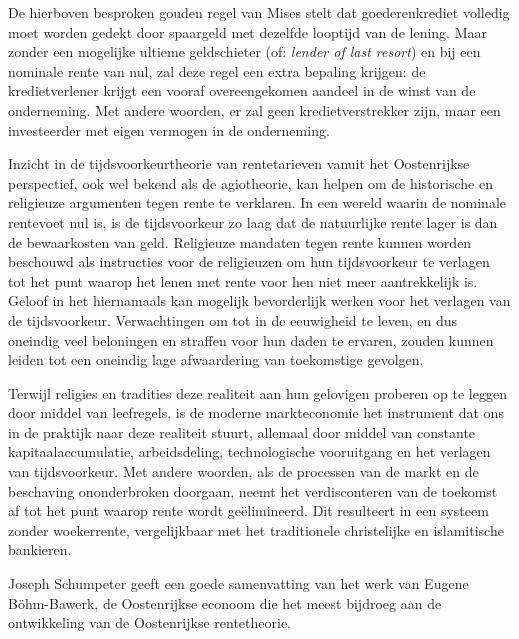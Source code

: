 De hierboven besproken gouden regel van Mises stelt dat goederenkrediet volledig moet worden gedekt door spaargeld met dezelfde looptijd van de lening. Maar zonder een mogelijke ultieme geldschieter (of: \emph{lender of last resort}) en bij een nominale rente van nul, zal deze regel een extra bepaling krijgen: de kredietverlener krijgt een vooraf overeengekomen aandeel in de winst van de onderneming. Met andere woorden, er zal geen kredietverstrekker zijn, maar een investeerder met eigen vermogen in de onderneming.

Inzicht in de tijdsvoorkeurtheorie van rentetarieven vanuit het Oostenrijkse perspectief, ook wel bekend als de agiotheorie, kan helpen om de historische en religieuze argumenten tegen rente te verklaren. In een wereld waarin de nominale rentevoet nul is, is de tijdsvoorkeur zo laag dat de natuurlijke rente lager is dan de bewaarkosten van geld. Religieuze mandaten tegen rente kunnen worden beschouwd als instructies voor de religieuzen om hun tijdsvoorkeur te verlagen tot het punt waarop het lenen met rente voor hen niet meer aantrekkelijk is. Geloof in het hiernamaals kan mogelijk bevorderlijk werken voor het verlagen van de tijdsvoorkeur. Verwachtingen om tot in de eeuwigheid te leven, en dus oneindig veel beloningen en straffen voor hun daden te ervaren, zouden kunnen leiden tot een oneindig lage afwaardering van toekomstige gevolgen.

Terwijl religies en tradities deze realiteit aan hun gelovigen proberen op te leggen door middel van leefregels, is de moderne markteconomie het instrument dat ons in de praktijk naar deze realiteit stuurt, allemaal door middel van constante kapitaalaccumulatie, arbeidsdeling, technologische vooruitgang en het verlagen van tijdsvoorkeur. Met andere woorden, als de processen van de markt en de beschaving ononderbroken doorgaan, neemt het verdisconteren van de toekomst af tot het punt waarop rente wordt geëlimineerd. Dit resulteert in een systeem zonder woekerrente, vergelijkbaar met het traditionele christelijke en islamitische bankieren.

Joseph Schumpeter geeft een goede samenvatting van het werk van Eugene Böhm-Bawerk, de Oostenrijkse econoom die het meest bijdroeg aan de ontwikkeling van de Oostenrijkse rentetheorie.

